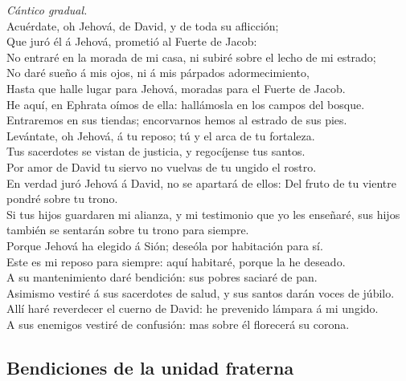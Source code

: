  \emph{Cántico gradual.}\\
Acuérdate, oh Jehová, de David, y de toda su aflicción;\\
 Que juró él á Jehová, prometió al Fuerte de Jacob:\\
 No entraré en la morada de mi casa, ni subiré sobre el
lecho de mi estrado;\\
 No daré sueño á mis ojos, ni á mis párpados
adormecimiento,\\
 Hasta que halle lugar para Jehová, moradas para el Fuerte
de Jacob.\\
 He aquí, en Ephrata oímos de ella: hallámosla en los campos
del bosque.\\
 Entraremos en sus tiendas; encorvarnos hemos al estrado de
sus pies.\\
 Levántate, oh Jehová, á tu reposo; tú y el arca de tu
fortaleza.\\
 Tus sacerdotes se vistan de justicia, y regocíjense tus
santos.\\
 Por amor de David tu siervo no vuelvas de tu ungido el
rostro.\\
 En verdad juró Jehová á David, no se apartará de ellos:
Del fruto de tu vientre pondré sobre tu trono.\\
 Si tus hijos guardaren mi alianza, y mi testimonio que yo
les enseñaré, sus hijos también se sentarán sobre tu trono para
siempre.\\
 Porque Jehová ha elegido á Sión; deseóla por habitación
para sí.\\
 Este es mi reposo para siempre: aquí habitaré, porque la
he deseado.\\
 A su mantenimiento daré bendición: sus pobres saciaré de
pan.\\
 Asimismo vestiré á sus sacerdotes de salud, y sus santos
darán voces de júbilo.\\
 Allí haré reverdecer el cuerno de David: he prevenido
lámpara á mi ungido.\\
 A sus enemigos vestiré de confusión: mas sobre él
florecerá su corona.

\hypertarget{bendiciones-de-la-unidad-fraterna}{%
\subsection{Bendiciones de la unidad
fraterna}\label{bendiciones-de-la-unidad-fraterna}}

